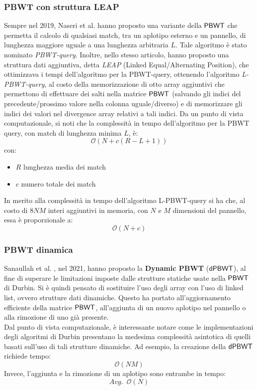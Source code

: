 \subsubsection{PBWT con struttura LEAP}
Sempre nel 2019, Naseri et al. \cite{leap} hanno proposto una variante della
$\mbox{\rm {\sf PBWT}}$ 
che permetta il calcolo di qualsiasi match, tra un aplotipo esterno e un
pannello, di lunghezza maggiore uguale a una 
lunghezza arbitraria $L$. Tale algoritmo è stato nominato
\textit{PBWT-query}. Inoltre, nello 
stesso articolo, hanno proposto
una struttura dati aggiuntiva, detta \textit{LEAP} (Linked
Equal/Alternating Position), che ottimizzava i tempi
dell'algoritmo per la PBWT-query, ottenendo l'algoritmo
\textit{L-PBWT-query}, al costo della 
memorizzazione di otto array aggiuntivi che permettono di effettuare dei
salti nella matrice $\mbox{\rm {\sf PBWT}}$ (salvando gli indici del precedente/prossimo
valore nella colonna uguale/diverso) e di memorizzare gli indici dei valori
nel divergence array relativi a tali indici.
Da un punto di vista computazionale, si noti che la complessità in tempo
dell'algoritmo 
per la PBWT query, con match di lunghezza minima $L$, è:
\begin{equation}
  \label{eq:leap1}
  \mathcal{O}(N+c(R-L+1))
\end{equation}
con:
\begin{itemize}
  \item $R$ lunghezza media dei match
  \item $c$ numero totale dei match
\end{itemize}
In merito alla complessità in tempo dell'algoritmo L-PBWT-query si ha che, al
costo di $8\mathit{NM}$ interi aggiuntivi in memoria, con $N$ e $M$ dimensioni
del 
pannello, essa è proporzionale a: 
\begin{equation}
  \label{eq:leap2}
  \mathcal{O}(N+c)
\end{equation}
\subsubsection{PBWT dinamica}
Sanaullah et al. \cite{dpbwt}, nel 2021, hanno proposto la \textbf{Dynamic PBWT}
($\mbox{\rm {\sf dPBWT}}$), 
al fine di superare le limitazioni imposte dalle strutture
statiche usate nella $\mbox{\rm {\sf PBWT}}$ di Durbin. Si è quindi pensato di sostituire
l'uso degli array con l'uso di linked list, ovvero strutture dati
dinamiche.
Questo ha portato all'aggiornamento
efficiente della matrice $\mbox{\rm {\sf PBWT}}$, all'aggiunta di un nuovo aplotipo nel
pannello o alla rimozione di uno già presente.\\
Dal punto di vista computazionale, è interessante notare come le
implementazioni degli algoritmi di Durbin presentano la medesima complessità
asintotica di quelli basati sull'uso di tali strutture dinamiche. Ad
esempio, la creazione della $\mbox{\rm {\sf dPBWT}}$ richiede tempo:
\begin{equation}
  \label{eq:dpbwt}
  \mathcal{O}(\mathit{NM})
\end{equation}
Invece, l'aggiunta e la rimozione di un aplotipo sono entrambe in tempo:
\begin{equation}
  \label{eq:dpbwt1}
  Avg.\,\,\,\mathcal{O}(N)
\end{equation}
